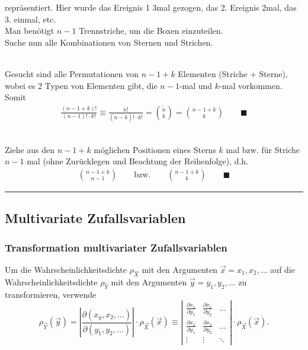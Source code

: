 \documentclass{article}
\begin{document}
{	repräsentiert. Hier wurde das Ereignis 1 3mal gezogen, das 2. Ereignis 2mal, das 3. einmal, etc.\\
	Man benötigt $n-1$ Trennstriche, um die Boxen einzuteilen.\\
	Suche nun alle Kombinationen von Sternen und Strichen.
	
	
	\newpage
	
	
	\\
	Gesucht sind alle Permutationen von $n-1+k$ Elementen (Striche + Sterne), wobei es 2 Typen von Elementen gibt, die $n-1$-mal und $k$-mal vorkommen. Somit
		\begin{align*}
			\frac{(n-1+k)!}{(n-1)!\cdot k!} \equiv \frac{\tilde{n}!}{(\tilde{n}-k)! \cdot k!} = \binom{\tilde{n}}{k} = \binom{n-1+k}{k} \qquad \blacksquare
		\end{align*}
	
	\\
	Ziehe aus den $n-1+k$ möglichen Positionen eines Sterns $k$ mal bzw. für Striche $n-1$ mal (ohne Zurücklegen und Beachtung der Reihenfolge), d.h.
		\begin{align*}
			\binom{n-1+k}{n-1} \qquad\text{bzw.}\qquad \binom{n-1+k}{k} \qquad \blacksquare
		\end{align*}
\hrule
}


\newpage


\subsection{Multivariate Zufallsvariablen}
\subsubsection{Transformation multivariater Zufallsvariablen}
Um die Wahrscheinlichkeitsdichte $\rho_{\hat{X}}$ mit den Argumenten $\vec{x} = x_1, x_2, ...$ auf die Wahrscheinlichkeitsdichte $\rho_{\hat{Y}}$ mit den Argumenten $\vec{y} = y_1, y_2, ...$ zu transformieren, verwende
	\begin{equation}
		\rho_{\vec{Y}}(\vec{y}) =
		\left| \frac{\partial(x_y, x_2, ...)}{\partial (y_1, y_2, ...)} \right| \cdot \rho_{\vec{X}}(\vec{x}) \equiv
		\left| 
		\begin{matrix}
			\frac{\partial x_1}{\partial y_1} & \frac{\partial x_1}{\partial y_2} & ... \\
			\frac{\partial x_2}{\partial y_1} & \frac{\partial x_2}{\partial y_2} & ... \\
			\vdots & \vdots & \ddots
		\end{matrix}
		\right| \cdot \rho_{\vec{X}}(\vec{x}).
	\end{equation}
\end{document}
